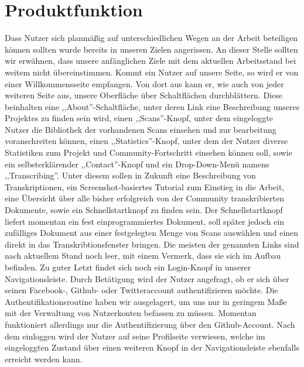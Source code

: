 \documentclass{article}
\begin{document}
\section{Produktfunktion}
Dass Nutzer sich planmäßig auf unterschiedlichen Wegen an der Arbeit beteiligen können sollten wurde bereits in unseren Zielen angerissen.
An dieser Stelle sollten wir erwähnen,%
dass unsere anfänglichen Ziele mit dem aktuellen Arbeitsstand bei weitem nicht übereinstimmen.
Kommt ein Nutzer auf unsere Seite, so wird er von einer Willkommensseite empfangen.
Von dort aus kann er, wie auch von jeder weiteren Seite aus, unsere Oberfläche über Schaltflächen durchblättern.
Diese beinhalten eine ,,About''-Schaltfläche, unter deren Link eine Beschreibung unseres Projektes zu finden sein wird, einen ,,Scans''-Knopf,
unter dem eingeloggte Nutzer die Bibliothek der vorhandenen Scans einsehen und zur bearbeitung voranschreiten können, einen ,,Statistics''-Knopf,
unter dem der Nutzer diverse Statistiken zum Projekt und Community-Fortschritt einsehen können soll,
sowie ein selbsterklärender ,,Contact''-Knopf und ein Drop-Down-Menü namens ,,Transcribing''.
Unter diesem sollen in Zukunft eine Beschreibung von Transkriptionen, ein Screenshot-basiertes Tutorial zum Einstieg in die Arbeit,
eine Übersicht über alle bisher erfolgreich von der Community transkribierten Dokumente, sowie ein Schnellstartknopf zu finden sein.
Der Schnellstartknopf liefert momentan ein fest einprogrammiertes Dokument,
soll später jedoch ein zufälliges Dokument aus einer festgelegten Menge von Scans auswählen und einen direkt in das Transkribtionsfenster bringen.
Die meisten der genannten Links sind nach aktuellem Stand noch leer, mit einem Vermerk,
dass sie sich im Aufbau befinden. Zu guter Letzt findet sich noch ein Login-Knopf in unserer Navigationsleiste.
Durch Betätigung wird der Nutzer angefragt, ob er sich über seinen Facebook-, Github- oder Twitteraccount authentifizieren möchte.%
Die Authentifikationsroutine haben wir ausgelagert, um uns nur in geringem Maße mit der Verwaltung von Nutzerkonten befassen zu müssen.
Momentan funktioniert allerdings nur die Authentifizierung über den Github-Account.
Nach dem einloggen wird der Nutzer auf seine Profilseite verwiesen, welche im eingeloggten Zustand über einen weiteren Knopf
in der Navigationsleiste ebenfalls erreicht werden kann.
\end{document}
